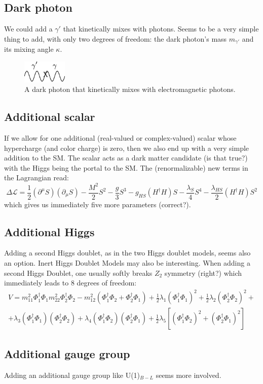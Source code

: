 \documentclass[11pt,singleside,a4paper,makeidx,notitlepage]{article}
\begin{document}
\subsection*{Dark photon}
\label{sec:photon}
We could add a $\gamma'$ that kinetically mixes with photons. Seems to be a
very simple thing to add, with only two degrees of freedom: the dark photon's
mass $m_{\gamma'}$ and its mixing angle $\kappa$.
\begin{figure}[h!t]
\begin{center}
\includegraphics[width=60pt]{kinetic_mixing.png}
\caption{A dark photon that kinetically mixes with electromagnetic photons.}
\label{fig_darkphoton}
\end{center}
\end{figure}

\subsection*{Additional scalar}
\label{sec:scalar}
If we allow for one additional (real-valued or complex-valued) scalar whose
hypercharge (and color charge) is zero, then we also end up with a very simple
addition to the SM. The scalar acts as a dark matter candidate (is that true?)
with the Higgs being the portal to the SM. The (renormalizable) new terms in the Lagrangian
read:
\begin{equation}
 \Delta \mathcal{L} = \frac{1}{2} (\partial^{\mu} S) (\partial_{\mu} S) -
\frac{M^2}{2} S^{2} - \frac{g}{3} S^3 - g_{HS} (H^{\dagger} H) S -
\frac{\lambda_S}{4}S^4 - \frac{\lambda_{HS}}{2} (H^{\dagger} H) S^2
\end{equation}
which gives us immediately five more parameters (correct?).

\subsection*{Additional Higgs}
\label{sec:higgs}
Adding a second Higgs doublet, as in the two Higgs doublet models, seems also 
an option. Inert Higgs Doublet Models may also be interesting. 
When adding a second Higgs Doublet, one usually softly breaks $Z_2$ symmetry
(right?) which immediately leads to 8 degrees of freedom:
\begin{eqnarray}
 V = m_{11}^2 \Phi_1^\dagger \Phi_1 m_{22}^2 \Phi_2^\dagger \Phi_2 - m_{12}^2
\left( \Phi_1^\dagger \Phi_2 + \Phi_2^\dagger \Phi_1 \right) + \frac{1}{2}
\lambda_1 (\Phi_1^\dagger \Phi_1)^2  + \frac{1}{2} \lambda_2 (\Phi_2^\dagger
\Phi_2)^2 + \\ 
+ \lambda_3 (\Phi_1^\dagger \Phi_1) (\Phi_2^\dagger \Phi_2) +
\lambda_4 (\Phi_1^\dagger \Phi_2) (\Phi_2^\dagger \Phi_1) + \frac{1}{2}
\lambda_5 \left[ (\Phi_1^\dagger \Phi_2)^2 + (\Phi_2^\dagger \Phi_1)^2   \right]
\end{eqnarray}

\subsection*{Additional gauge group}
\label{sec:gauge}
Adding an additional gauge group like U(1)$_{B-L}$ seems more involved.

%
% 
\end{document}
